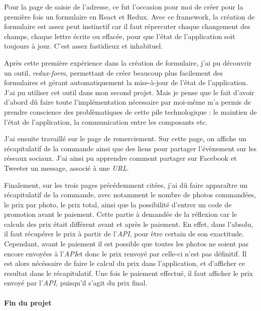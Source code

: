 \documentclass[12pt,a4paper]{article}
\begin{document}
  \bigskip

  Pour la page de saisie de l'adresse, ce fut l'occasion pour moi de créer
  pour la première fois un formulaire en React et Redux. Avec ce
  framework, la création de formulaire est assez peut instinctif car il
  faut répercuter chaque changement des champs, chaque lettre écrite ou
  effacée, pour que l'état de l'application soit toujours à jour. C'est
  assez fastidieux et inhabituel.

  \bigskip

  Après cette première expérience dans la création de formulaire, j'ai pu
  découvrir un outil, \emph{redux-form}, permettant de créer beaucoup plus
  facilement des formulaires et gérant automatiquement la mise-à-jour de
  l'état de l'application. J'ai pu utiliser cet outil dans mon second
  projet. Mais je pense que le fait d'avoir d'abord dû faire toute
  l'implémentation nécessaire par moi-même m'a permis de prendre
  conscience des problèmatiques de cette pile technologique : le maintien
  de l'état de l'application, la communication entre les composants etc.

  \bigskip

  J'ai ensuite travaillé sur le page de remerciement. Sur cette page, on
  affiche un récapitulatif de la commande ainsi que des liens pour
  partager l'évènement sur les réseaux sociaux. J'ai ainsi pu apprendre
  comment partager sur Facebook et Tweeter un message, associé à une
  \emph{URL}.

  \bigskip

  Finalement, sur les trois pages précédemment citées, j'ai dû faire
  apparaître un récapitulatif de la commande, avec notamment le nombre de
  photos commandées, le prix par photo, le prix total, ainsi que la
  possibilité d'entrer un code de promotion avant le paiement. Cette
  partie à demandée de la réflexion car le calculs des prix était
  différent avant et après le paiement. En effet, dans l'absolu, il faut
  récupérer le prix à partir de l'\emph{API}, pour être certain de son
  exactitude. Cependant, avant le paiement il est possible que toutes les
  photos ne soient pas encore envoyées à l'\emph{API}et donc le prix
  renvoyé par celle-ci n'est pas définitif. Il est alors nécéssaire de
  faire le calcul du prix dans l'application, et d'afficher ce resultat
  dans le récapitulatif. Une fois le paiement effectué, il faut afficher
  le prix envoyé par l'\emph{API}, puisqu'il s'agit du prix final.

  \bigskip

  \paragraph{Fin du projet}\label{fin-du-projet}
\end{document}
